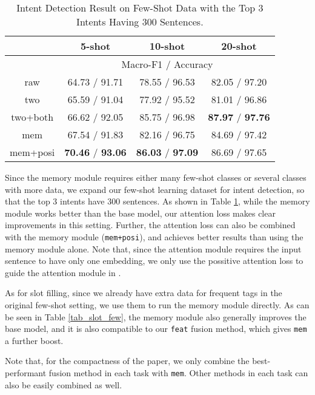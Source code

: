 \begin{table}
\setlength{\tabcolsep}{0.23em}
\centering
\small{
\begin{tabular}{|c|c|c|c|}

\hline
  & \multicolumn{1}{|c|}{5-shot} & \multicolumn{1}{|c|}{10-shot} & \multicolumn{1}{|c|}{20-shot}  \\
 \hline
  & \multicolumn{3}{|c|}{Macro-F1 / Accuracy}   \\
\hline
raw & 64.73 / 91.71 & 78.55 / 96.53 & 82.05 / 97.20 \\
\hline
two & 65.59 / 91.04 & 77.92 / 95.52 & 81.01 / 96.86 \\
\hline
two+both & 66.62 / 92.05 & 85.75 / 96.98 & \textbf{87.97} / \textbf{97.76} \\
\hline
mem & 67.54 / 91.83 & 82.16 / 96.75 & 84.69 / 97.42 \\
\hline
mem+posi & \textbf{70.46} / \textbf{93.06} & \textbf{86.03} / \textbf{97.09} & 86.69 / 97.65 \\
\hline

\end{tabular}
}
\caption{Intent Detection Result on Few-Shot Data with the Top 3 Intents Having 300 Sentences.}
\label{tab_intent_few_fill}
\end{table}

Since the memory module requires either many few-shot classes or several classes with more data, we expand our few-shot learning dataset for intent detection, so that the top 3 intents have 300 sentences. As shown in Table \ref{tab_intent_few_fill}, while the memory module works better than the base model, our attention loss makes clear improvements in this setting. Further, the attention loss can also be combined with the memory module (\texttt{mem+posi}), and achieves better results than using the memory module alone. Note that, since the attention module requires the input sentence to have only one embedding, we only use the possitive attention loss to guide the attention module in \BLSTM.

As for slot filling, since we already have extra data for frequent tags in the original few-shot setting, we use them to run the memory module directly. As can be seen in Table \ref{tab_slot_few}, the memory module also generally improves the base model, and it is also compatible to our \texttt{feat} fusion method, which gives \texttt{mem} a further boost.

Note that, for the compactness of the paper, we only combine the best-performant fusion method in each task with \texttt{mem}. Other methods in each task can also be easily combined as well. 

